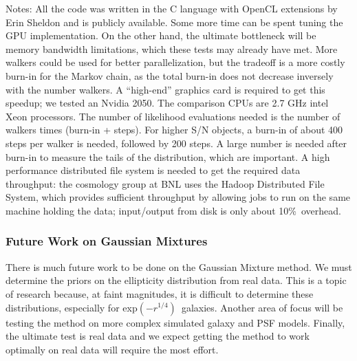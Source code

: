 \documentclass[12pt]{article}
\newcommand{\devprof}{exp$(-r^{1/4})$}
\newcommand{\iooverhead}{10\%}
\begin{document}
{\it
    
Notes:  All the code was written in the C language with OpenCL extensions by
Erin Sheldon and is publicly available.  Some more time can be spent tuning the
GPU implementation. On the other hand, the ultimate bottleneck will be memory
bandwidth limitations, which these tests may already have met.   More walkers
could be used for better parallelization, but the tradeoff is a more costly
burn-in for the Markov chain, as the total burn-in does not decrease inversely
with the number walkers.  A ``high-end'' graphics card is required to get this
speedup; we tested an Nvidia 2050. The comparison CPUs are 2.7 GHz intel Xeon
processors.  The number of likelihood evaluations needed is the number of
walkers times (burn-in + steps).  For higher S/N objects, a burn-in of about
400 steps per walker is needed, followed by 200 steps.  A large number is
needed after burn-in to measure the tails of the distribution, which are
important.  A high performance distributed file system is needed to get the
required data throughput: the cosmology group at BNL uses the Hadoop
Distributed File System, which provides sufficient throughput by allowing jobs
to run on the same machine holding the data; input/output from disk is only
about \iooverhead\ overhead.  }

\subsubsection{Future Work on Gaussian Mixtures}

There is much future work to be done on the Gaussian Mixture method.  We must
determine the priors on the ellipticity distribution from real data.  This is a
topic of research because, at faint magnitudes, it is difficult to determine
these distributions, especially for \devprof\ galaxies\cite{Miller12}.  Another
area of focus will be testing the method on more complex simulated galaxy and
PSF models.  Finally, the ultimate test is real data and we expect getting the
method to work optimally on real data will require the most effort.
\end{document}
